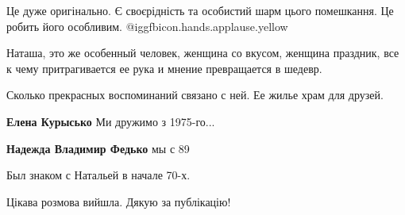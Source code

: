  
 
 
 
 
\zzSecCmt

\begin{itemize} %

Це дуже оригінально. Є своєрідність та особистий шарм цього помешкання. Це
робить його особливим. @igg{fbicon.hands.applause.yellow} 


Наташа, это же особенный человек, женщина со вкусом, женщина праздник, все к
чему притрагивается ее рука и мнение превращается в шедевр.

Сколько прекрасных воспоминаний связано с ней. Ее жилье храм для друзей.

\begin{itemize} %
\textbf{Елена Курысько} Ми дружимо з 1975-го...

\textbf{Надежда Владимир Федько} мы с 89

Был знаком с Натальей в начале 70-х.
\end{itemize} %

Цікава розмова вийшла. Дякую за публікацію!

\end{itemize} %
